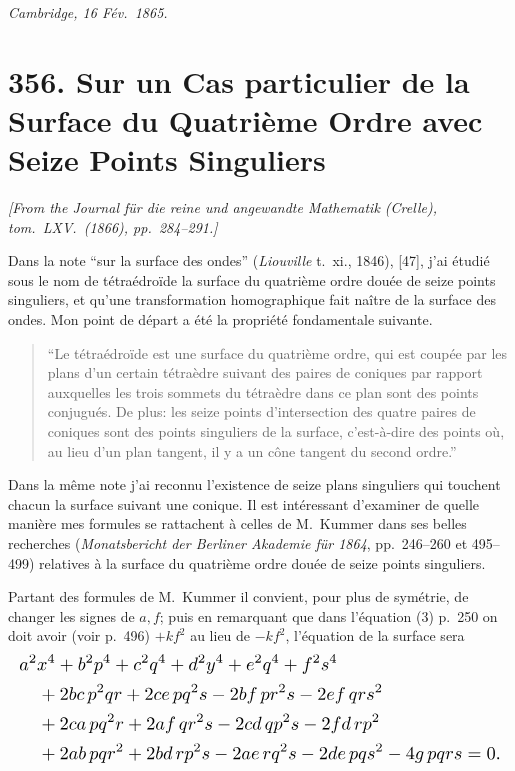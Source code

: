 \documentclass[11pt]{article}
\begin{document}
\medskip
\hfill\textit{Cambridge, 16 F\'ev.~1865.}


\bigskip
\section*{356. Sur un Cas particulier de la Surface du Quatri\`eme Ordre avec Seize Points Singuliers}


\noindent\textit{[From the \textit{Journal f\"ur die reine und angewandte Mathematik} (Crelle), tom.~LXV.~(1866), pp.~284--291.]}

\medskip

Dans la note ``sur la surface des ondes'' (\textit{Liouville} t.~xi., 1846), [47], j'ai \'etudi\'e sous le nom de t\'etra\'edro\"ide la surface du quatri\`eme ordre dou\'ee de seize points singuliers, et qu'une transformation homographique fait na\^itre de la surface des ondes. Mon point de d\'epart a \'et\'e la propri\'et\'e fondamentale suivante.

\begin{quote}
``Le t\'etra\'edro\"ide est une surface du quatri\`eme ordre, qui est coup\'ee par les plans d'un certain t\'etra\`edre suivant des paires de coniques par rapport auxquelles les trois sommets du t\'etra\`edre dans ce plan sont des points conjugu\'es. De plus: les seize points d'intersection des quatre paires de coniques sont des points singuliers de la surface, c'est-\`a-dire des points o\`u, au lieu d'un plan tangent, il y a un c\^one tangent du second ordre.''
\end{quote}

Dans la m\^eme note j'ai reconnu l'existence de seize plans singuliers qui touchent chacun la surface suivant une conique. Il est int\'eressant d'examiner de quelle mani\`ere mes formules se rattachent \`a celles de M.~Kummer dans ses belles recherches (\textit{Monatsbericht der Berliner Akademie f\"ur 1864}, pp.~246--260 et 495--499) relatives \`a la surface du quatri\`eme ordre dou\'ee de seize points singuliers.

Partant des formules de M.~Kummer il convient, pour plus de sym\'etrie, de changer les signes de $a, f$; puis en remarquant que dans l'\'equation (3) p.~250 on doit avoir (voir p.~496) $+ kf^{2}$ au lieu de $- kf^{2}$, l'\'equation de la surface sera
\[
\resizebox{\textwidth}{!}{$\displaystyle
\begin{aligned}
& a^{2} x^{4} + b^{2} p^{4} + c^{2} q^{4} + d^{2} y^{4} + e^{2} q^{4} + f^{2} s^{4} \\
& \quad + 2bc\, p^{2} qr + 2ce\, pq^{2} s - 2bf\, pr^{2} s - 2ef\, qr s^{2} \\
& \quad + 2ca\, pq^{2} r + 2af\, qr^{2} s - 2cd\, qp^{2} s - 2fd\, rp^{2} \\
& \quad + 2ab\, pqr^{2} + 2bd\, rp^{2} s - 2ae\, rq^{2} s - 2de\, pqs^{2} - 4g\, pqrs = 0.
\end{aligned}$}
\]
\end{document}
